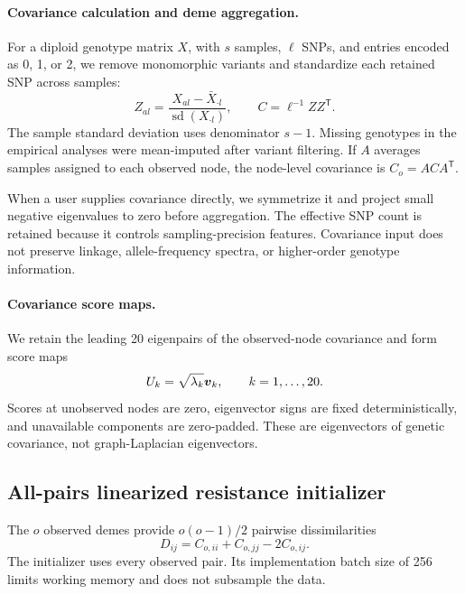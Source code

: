 \paragraph{Covariance calculation and deme aggregation.}
For a diploid genotype matrix $X$, with $s$ samples, $\ell$ SNPs, and entries
encoded as 0, 1, or 2, we remove monomorphic variants and standardize each
retained SNP across samples:
\begin{equation}
    Z_{al}
    =\frac{X_{al}-\bar X_{\cdot l}}
    {\operatorname{sd}(X_{\cdot l})},
    \qquad
    C=\ell^{-1}ZZ^\mathsf{T}.
    \label{eq:sample-covariance}
\end{equation}
The sample standard deviation uses denominator $s-1$. Missing genotypes in
the empirical analyses were mean-imputed after variant filtering. If $A$
averages samples assigned to each observed node, the node-level covariance is
$C_o=ACA^\mathsf{T}$.

When a user supplies covariance directly, we symmetrize it and project small
negative eigenvalues to zero before aggregation. The effective SNP count is
retained because it controls sampling-precision features. Covariance input
does not preserve linkage, allele-frequency spectra, or higher-order genotype
information.

\paragraph{Covariance score maps.}
We retain the leading 20 eigenpairs of the observed-node covariance and form
score maps
\begin{equation}
    U_k=\sqrt{\lambda_k}\boldsymbol{v}_k,
    \qquad k=1,\ldots,20.
    \label{eq:covariance-scores}
\end{equation}
Scores at unobserved nodes are zero, eigenvector signs are fixed
deterministically, and unavailable components are zero-padded. These are
eigenvectors of genetic covariance, not graph-Laplacian eigenvectors.

\subsection{All-pairs linearized resistance initializer}

The $o$ observed demes provide $o(o-1)/2$ pairwise dissimilarities
\begin{equation}
    D_{ij}=C_{o,ii}+C_{o,jj}-2C_{o,ij}.
\end{equation}
The initializer uses every observed pair. Its implementation batch size of
256 limits working memory and does not subsample the data.

